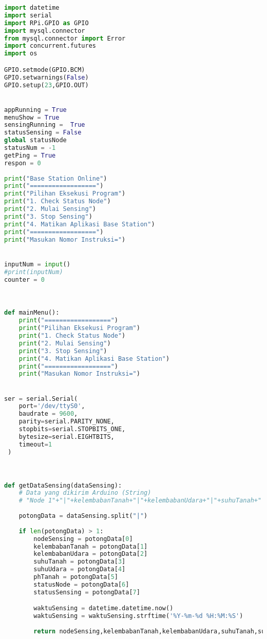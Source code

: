 \begin{lstlisting}[language=Python, caption=BaseStation.py]
import datetime
import serial
import RPi.GPIO as GPIO
import mysql.connector
from mysql.connector import Error
import concurrent.futures
import os

GPIO.setmode(GPIO.BCM)
GPIO.setwarnings(False)
GPIO.setup(23,GPIO.OUT)


appRunning = True
menuShow = True
sensingRunning =  True
statusSensing = False
global statusNode
statusNum = -1
getPing = True
respon = 0
    
print("Base Station Online")
print("==================")
print("Pilihan Eksekusi Program")
print("1. Check Status Node")
print("2. Mulai Sensing")
print("3. Stop Sensing")
print("4. Matikan Aplikasi Base Station")
print("==================")
print("Masukan Nomor Instruksi=")


inputNum = input()
#print(inputNum)
counter = 0



def mainMenu():
    print("==================")
    print("Pilihan Eksekusi Program")
    print("1. Check Status Node")
    print("2. Mulai Sensing")
    print("3. Stop Sensing")
    print("4. Matikan Aplikasi Base Station")
    print("==================")
    print("Masukan Nomor Instruksi=")


ser = serial.Serial(
    port='/dev/ttyS0',
    baudrate = 9600,
    parity=serial.PARITY_NONE,
    stopbits=serial.STOPBITS_ONE,
    bytesize=serial.EIGHTBITS,
    timeout=1             
 )



def getDataSensing(dataSensing):
    # Data yang dikirim Arduino (String)
    # "Node 1"+"|"+kelembabanTanah+"|"+kelembabanUdara+"|"+suhuTanah+"|"+suhuUdara+"|"+phTanah+"|"+statusNode+"|"+"statusSensing";
    
    potongData = dataSensing.split("|")
    
    if len(potongData) > 1:
        nodeSensing = potongData[0]
        kelembabanTanah = potongData[1]
        kelembabanUdara = potongData[2]
        suhuTanah = potongData[3]
        suhuUdara = potongData[4]
        phTanah = potongData[5]
        statusNode = potongData[6]
        statusSensing = potongData[7]

        waktuSensing = datetime.datetime.now()
        waktuSensing = waktuSensing.strftime('%Y-%m-%d %H:%M:%S')
        
        return nodeSensing,kelembabanTanah,kelembabanUdara,suhuTanah,suhuUdara,phTanah,statusNode,statusSensing,waktuSensing



\end{lstlisting}

